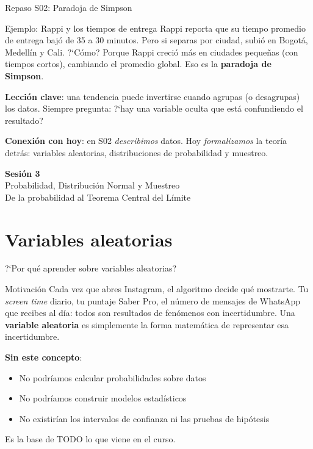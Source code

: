 \documentclass[aspectratio=169, 11pt]{beamer}
\begin{document}
\begin{frame}{Repaso S02: Paradoja de Simpson}
\small
\begin{exampleblock}{Ejemplo: Rappi y los tiempos de entrega}
Rappi reporta que su tiempo promedio de entrega baj\'o de 35 a 30 minutos. Pero si separas por ciudad, subi\'o en Bogot\'a, Medell\'in y Cali. ?`C\'omo? Porque Rappi creci\'o m\'as en ciudades peque\~nas (con tiempos cortos), cambiando el promedio global. Eso es la \textbf{paradoja de Simpson}.
\end{exampleblock}

\textbf{Lecci\'on clave}: una tendencia puede \alert{invertirse} cuando agrupas (o desagrupas) los datos. Siempre pregunta: ?`hay una variable oculta que est\'a confundiendo el resultado?

\vspace{0.5em}
\textbf{Conexi\'on con hoy}: en S02 \emph{describimos} datos. Hoy \emph{formalizamos} la teor\'ia detr\'as: variables aleatorias, distribuciones de probabilidad y muestreo.
\end{frame}

\begin{frame}{}
\vfill
\centering
{\Large\textbf{Sesi\'on 3}}\\[1em]
{\normalsize Probabilidad, Distribuci\'on Normal y Muestreo}\\[0.5em]
{\small De la probabilidad al Teorema Central del L\'imite}
\vfill
\end{frame}

\section{Variables aleatorias}

\begin{frame}{?`Por qu\'e aprender sobre variables aleatorias?}
\begin{exampleblock}{Motivaci\'on}
Cada vez que abres Instagram, el algoritmo decide qu\'e mostrarte. Tu \emph{screen time} diario, tu puntaje Saber Pro, el n\'umero de mensajes de WhatsApp que recibes al d\'ia: todos son resultados de fen\'omenos con incertidumbre. Una \textbf{variable aleatoria} es simplemente la forma matem\'atica de representar esa incertidumbre.
\end{exampleblock}

\textbf{Sin este concepto}:
\begin{itemize}\setlength{\itemsep}{1pt}
  \item No podr\'iamos calcular probabilidades sobre datos
  \item No podr\'iamos construir modelos estad\'isticos
  \item No existir\'ian los intervalos de confianza ni las pruebas de hip\'otesis
\end{itemize}

\alert{Es la base de TODO lo que viene en el curso.}
\end{frame}
\end{document}
